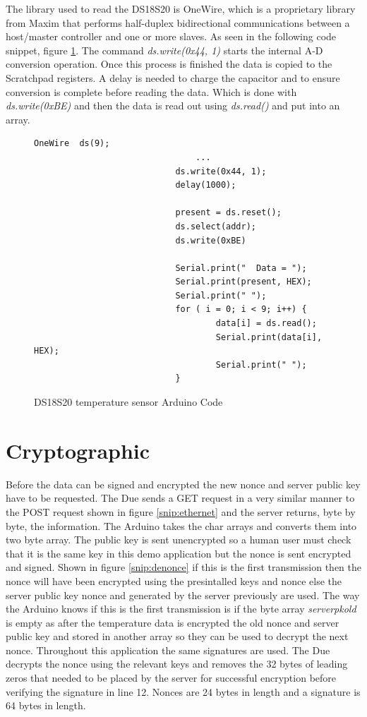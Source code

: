 The library used to read the DS18S20 is OneWire, which is a proprietary library from Maxim that performs half-duplex bidirectional communications between a host/master controller and one or more slaves. As seen in the following code snippet, figure \ref{snip:tempcode}. The command \emph{ds.write(0x44, 1)} starts the internal A-D conversion operation. Once this process is finished the data is copied to the Scratchpad registers. A delay is needed to charge the capacitor and to ensure conversion is complete before reading the data. Which is done with \emph{ds.write(0xBE)} and then the data is read out using \emph{ds.read()} and put into an array.

\begin{figure}[H]
\begin{lstlisting}[style=Arduino]
  							OneWire  ds(9);
								...
  							ds.write(0x44, 1); 
  						 	delay(1000);

  							present = ds.reset();
  							ds.select(addr);    
 							ds.write(0xBE)

  							Serial.print("  Data = "); 
  							Serial.print(present, HEX);
 						 	Serial.print(" ");
  							for ( i = 0; i < 9; i++) {          
    								data[i] = ds.read();
    								Serial.print(data[i], HEX);
    								Serial.print(" ");
  							}

\end{lstlisting}
\caption{DS18S20 temperature sensor Arduino Code}
\label{snip:tempcode}
\end{figure}


\section{Cryptographic}

Before the data can be signed and encrypted the new nonce and server public key have to be requested. The Due sends a GET request in a very similar manner to the POST request shown in figure \ref{snip:ethernet} and the server returns, byte by byte, the information. The Arduino takes the char arrays and converts them into two byte array. The public key is sent unencrypted so a human user must check that it is the same key in this demo application but the nonce is sent encrypted and signed. Shown in figure \ref{snip:denonce} if this is the first transmission then the nonce will have been encrypted using the presintalled keys and nonce else the server public key nonce and generated by the server previously are used. The way the Arduino knows if this is the first transmission is if the byte array \emph{serverpkold} is empty as after the temperature data is encrypted the old nonce and server public key and stored in another array so they can be used to decrypt the next nonce. Throughout this application the same signatures are used. The Due decrypts the nonce using the relevant keys and removes the 32 bytes of leading zeros that needed to be placed by the server for successful encryption before verifying the signature in line 12. Nonces are 24 bytes in length and a signature is 64 bytes in length.

